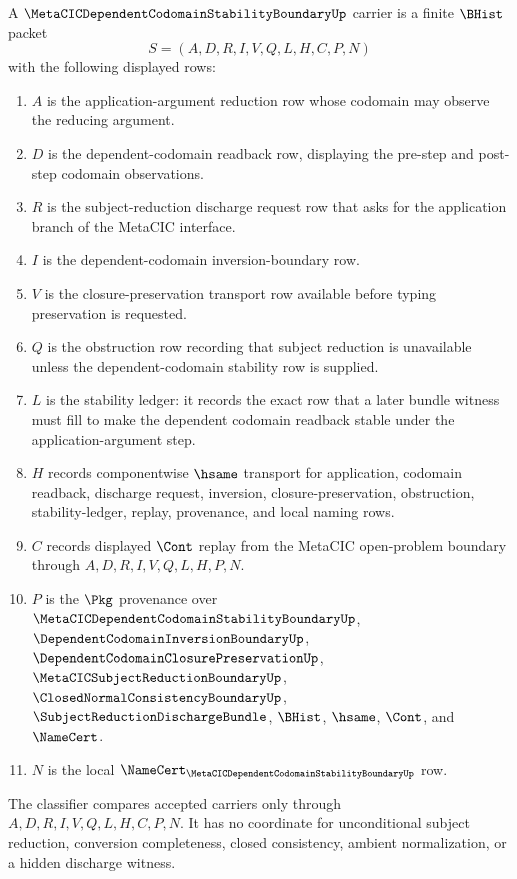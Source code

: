 \begin{definition}
\label{def:metacic-dependent-codomain-stability-boundary-carrier}
A $\MetaCICDependentCodomainStabilityBoundaryUp$ carrier is a finite $\BHist$ packet
$$
S=(A,D,R,I,V,Q,L,H,C,P,N)
$$
with the following displayed rows:
\begin{enumerate}
\item $A$ is the application-argument reduction row whose codomain may observe the reducing argument.
\item $D$ is the dependent-codomain readback row, displaying the pre-step and post-step codomain observations.
\item $R$ is the subject-reduction discharge request row that asks for the application branch of the MetaCIC interface.
\item $I$ is the dependent-codomain inversion-boundary row.
\item $V$ is the closure-preservation transport row available before typing preservation is requested.
\item $Q$ is the obstruction row recording that subject reduction is unavailable unless the dependent-codomain stability row is supplied.
\item $L$ is the stability ledger: it records the exact row that a later bundle witness must fill to make the dependent codomain readback stable under the application-argument step.
\item $H$ records componentwise $\hsame$ transport for application, codomain readback, discharge request, inversion, closure-preservation, obstruction, stability-ledger, replay, provenance, and local naming rows.
\item $C$ records displayed $\Cont$ replay from the MetaCIC open-problem boundary through $A,D,R,I,V,Q,L,H,P,N$.
\item $P$ is the $\Pkg$ provenance over $\MetaCICDependentCodomainStabilityBoundaryUp$, $\DependentCodomainInversionBoundaryUp$, $\DependentCodomainClosurePreservationUp$, $\MetaCICSubjectReductionBoundaryUp$, $\ClosedNormalConsistencyBoundaryUp$, $\SubjectReductionDischargeBundle$, $\BHist$, $\hsame$, $\Cont$, and $\NameCert$.
\item $N$ is the local $\NameCert_{\MetaCICDependentCodomainStabilityBoundaryUp}$ row.
\end{enumerate}
The classifier compares accepted carriers only through $A,D,R,I,V,Q,L,H,C,P,N$. It has no coordinate for unconditional subject reduction, conversion completeness, closed consistency, ambient normalization, or a hidden discharge witness.
\end{definition}

